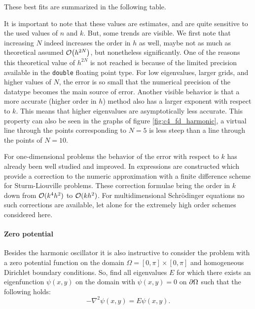 These best fits are summarized in the following table.
\begin{center}
    
\end{center}

It is important to note that these values are estimates, and are quite sensitive to the used values of $n$ and $k$. But, some trends are visible. We first note that increasing $N$ indeed increases the order in $h$ as well, maybe not as much as theoretical assumed $\OO\mleft(h^{2N}\mright)$, but nonetheless significantly. One of the reasons this theoretical value of $h^{2N}$ is not reached is because of the limited precision available in the \texttt{double} floating point type. For low eigenvalues, larger grids, and higher values of $N$, the error is so small that the numerical precision of the datatype becomes the main source of error. Another visible behavior is that a more accurate (higher order in $h$) method also has a larger exponent with respect to $k$. This means that higher eigenvalues are asymptotically less accurate. This property can also be seen in the graphs of figure \ref{fig:c4_fd_harmonic}, a virtual line through the points corresponding to $N = 5$ is less steep than a line through the points of $N = 10$.

For one-dimensional problems the behavior of the error with respect to $k$ has already been well studied and improved. In \cite{paine_correction_1981} expressions are constructed which provide a correction to the numeric approximation with a finite difference scheme for Sturm-Liouville problems. These correction formulae bring the order in $k$ down from $\operatorname{\mathcal{O}}(k^4h^2)$ to $\operatorname{\mathcal{O}}(k h^2)$. For multidimensional Schrödinger equations no such corrections are available, let alone for the extremely high order schemes considered here.

\paragraph{Zero potential} Besides the harmonic oscillator it is also instructive to consider the problem with a zero potential function on the domain $\Omega = [0, \pi] \times [0, \pi]$ and homogeneous Dirichlet boundary conditions. So, find all eigenvalues $E$ for which there exists an eigenfunction $\psi(x, y)$ on the domain with $\psi(x, y) = 0$ on $\partial\Omega$ such that the following holds:
\begin{equation}\label{equ:c4_fd_zero}
    -\nabla^2 \psi(x, y) = E \psi(x, y) \text{.}
\end{equation}

